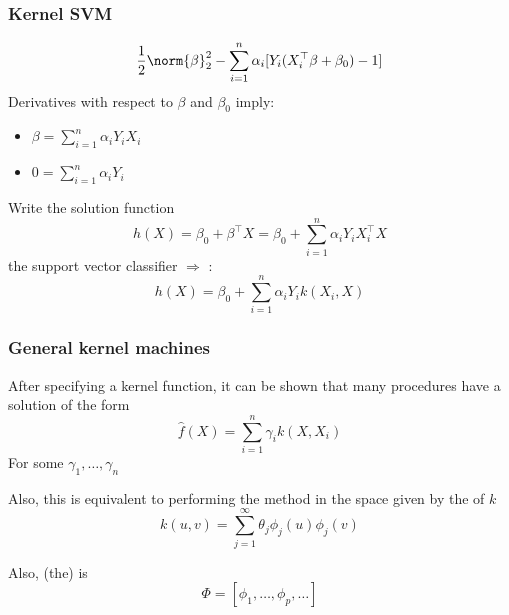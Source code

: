\documentclass[12pt]{beamer}
\begin{document}
\begin{frame}
\frametitle{Kernel SVM}
\[
\frac{1}{2}\norm{\beta}_2^2 - \sum_{i=1}^n\alpha_i[Y_i(X_i^{\top}\beta + \beta_0) - 1]
\]
Derivatives with respect to $\beta$ and $\beta_0$ imply:

\begin{itemize}
\item $\beta = \sum_{i=1}^n \alpha_i Y_iX_i$
\item $0 = \sum_{i=1}^n \alpha_i Y_i$
\end{itemize}
Write the solution function
\[
h(X) = \beta_0 + \beta^{\top}X = \beta_0 + \sum_{i=1}^n\alpha_iY_iX_i^{\top}X
\]
 the support vector classifier $\Rightarrow$ :
\[
h(X) = \beta_0 + \sum_{i=1}^n\alpha_iY_ik(X_i,X)
\]

\end{frame}
%
%


\begin{frame}
\frametitle{General kernel machines}
After specifying a kernel function, it 
can be shown that many procedures have a solution of the form
\[
\hat{f}(X) = \sum_{i=1}^n \gamma_i k(X,X_i)
\]
For some $\gamma_1,\ldots,\gamma_n$

\vsp
Also, this is equivalent to performing the method in the space given by
the  of $k$
\[
k(u,v) = \sum_{j=1}^\infty \theta_j \phi_j(u)\phi_j(v)
\]

\vsp
Also, (the)  is
\[
\Phi = [\phi_1,\ldots,\phi_p,\ldots]
\]
\end{frame}
%
%
%
%
%
\end{document}
